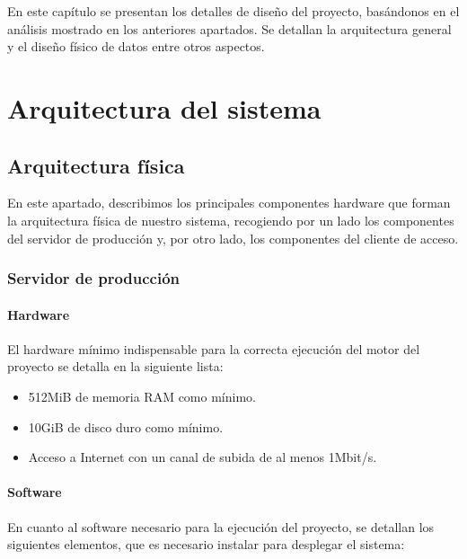 En este capítulo se presentan los detalles de diseño del proyecto, basándonos en
el análisis mostrado en los anteriores apartados. Se detallan la arquitectura
general y el diseño físico de datos entre otros aspectos.

\section{Arquitectura del sistema}

\subsection{Arquitectura física}
\label{sec:arquitectura-fisica}

En este apartado, describimos los principales componentes hardware que forman la
arquitectura física de nuestro sistema, recogiendo por un lado los componentes
del servidor de producción y, por otro lado, los componentes del cliente de acceso.

\subsubsection{Servidor de producción}
\label{subsec:entorno-produccion}

\paragraph{Hardware}

El hardware mínimo indispensable para la correcta ejecución del motor del
proyecto se detalla en la siguiente lista:

\begin{itemize}
\item 512MiB de memoria RAM como mínimo.
\item 10GiB de disco duro como mínimo.
\item Acceso a Internet con un canal de subida de al menos 1Mbit/s.
\end{itemize}

\paragraph{Software}

En cuanto al software necesario para la ejecución del proyecto, se detallan los
siguientes elementos, que es necesario instalar para desplegar el sistema:

